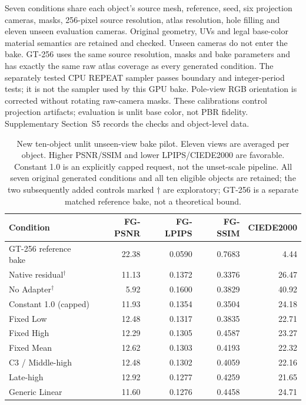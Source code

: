 \documentclass[times,twocolumn,final]{elsarticle}
\begin{document}
Seven conditions share each object's source mesh, reference, seed, six projection cameras, masks, 256-pixel source resolution, atlas resolution, hole filling and eleven unseen evaluation cameras. Original geometry, UVs and legal base-color material semantics are retained and checked. Unseen cameras do not enter the bake. GT-256 uses the same source resolution, masks and bake parameters and has exactly the same raw atlas coverage as every generated condition. The separately tested CPU REPEAT sampler passes boundary and integer-period tests; it is not the sampler used by this GPU bake. Pole-view RGB orientation is corrected without rotating raw-camera masks. These calibrations control projection artifacts; evaluation is unlit base color, not PBR fidelity. Supplementary Section~S5 records the checks and object-level data.

\begin{table}[ht]
\centering\scriptsize
\caption{New ten-object unlit unseen-view bake pilot. Eleven views are averaged per object. Higher PSNR/SSIM and lower LPIPS/CIEDE2000 are favorable. Constant 1.0 is an explicitly capped request, not the unset-scale pipeline. All seven original generated conditions and all ten eligible objects are retained; the two subsequently added controls marked $\dagger$ are exploratory; GT-256 is a separate matched reference bake, not a theoretical bound.}
\label{tab:new-bake}
\begin{tabular}{lrrrr}
\toprule Condition & FG-PSNR & FG-LPIPS & FG-SSIM & CIEDE2000 \\
\midrule
GT-256 reference bake & 22.38 & 0.0590 & 0.7683 & 4.44 \\
\midrule
Native residual$^\dagger$ & 11.13 & 0.1372 & 0.3376 & 26.47 \\
No Adapter$^\dagger$ & 5.92 & 0.1600 & 0.3829 & 40.92 \\
Constant 1.0 (capped) & 11.93 & 0.1354 & 0.3504 & 24.18 \\
Fixed Low & 12.48 & 0.1317 & 0.3835 & 22.71 \\
Fixed High & 12.29 & 0.1305 & 0.4587 & 23.27 \\
Fixed Mean & 12.62 & 0.1303 & 0.4193 & 22.32 \\
C3 / Middle-high & 12.48 & 0.1302 & 0.4059 & 22.16 \\
Late-high & 12.92 & 0.1277 & 0.4259 & 21.65 \\
Generic Linear & 11.60 & 0.1276 & 0.4458 & 24.71 \\
\bottomrule\end{tabular}
\end{table}
\end{document}
